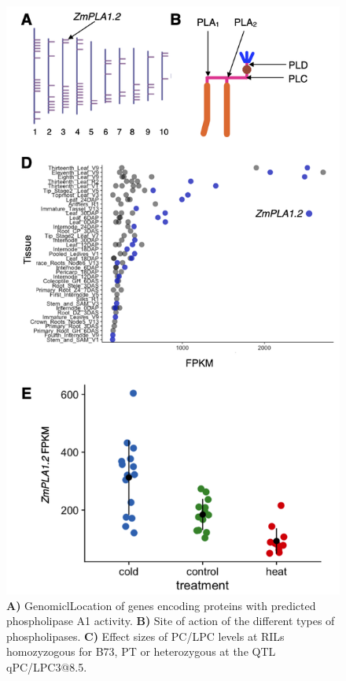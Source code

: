 \documentclass[9pt,twocolumn,twoside,lineno]{biorxiv}
\begin{document}
\begin{figure}[t]
\begin{center}
\includegraphics[width=0.4\paperwidth]{Sup_Figures/Sup_Fig_3.png}
\caption{\textbf{A)} GenomiclLocation of genes encoding proteins with predicted phospholipase A1 activity. 
\textbf{B)} Site of action of the different types of phospholipases.
\textbf{C)} Effect sizes of PC/LPC levels at RILs homozyzogous for B73, PT or heterozygous at the QTL qPC/LPC3@8.5.
} 
\label{SupFig3}
\end{center}
\end{figure}  
\end{document}
